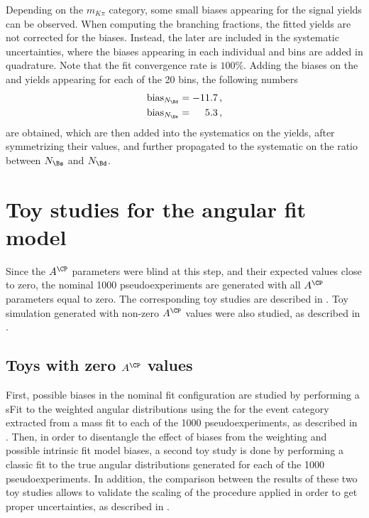 Depending on the $m_{K\pi}$ category, some small biases appearing for the \Bs signal yields can be observed. When computing the branching fractions, the fitted yields are not corrected for the biases. Instead, the later are included in the systematic uncertainties, where the biases appearing in each individual \mkpi and \cosTmu bins are added in quadrature. Note that the fit convergence rate is $100\%$. Adding the biases on the \Bs and \Bd yields appearing for each of the 20 bins, the following numbers
\begin{align}
{\rm bias}_{N_{\Bd}} &= -11.7 \, ,\\
{\rm bias}_{N_{\Bs}} &= \phantom{-2}5.3\, ,
\end{align}
are obtained, which are then added into the systematics on the yields, after symmetrizing their values, and further propagated to the systematic on the ratio between $N_{\Bs}$ and $N_{\Bd}$. 
\section{Toy studies for the angular fit model}\label{app:BsJpsiKst_AngularToysimulation}
Since the $A^{\CP}$ parameters were blind at this step, and their expected values close to zero, the nominal 1000 pseudoexperiments are generated with all $A^{\CP}$ parameters equal to zero. The corresponding toy studies are described in . Toy simulation generated with non-zero $A^{\CP}$ values were also studied, as described in .
\subsection{Toys with zero $A^{\CP}$ values}\label{sec:ZACPs}
First, possible biases in the nominal fit configuration are studied by performing a sFit to the weighted angular distributions using the \sweights for the \Bs event category extracted from a mass fit to each of the 1000 pseudoexperiments, as described in . Then, in order to disentangle the effect of biases from the weighting and possible intrinsic fit model biases, a second toy study is done by performing a classic fit to the true \Bs angular distributions generated for each of the 1000 pseudoexperiments. In addition, the comparison between the results of these two toy studies allows to validate the scaling of the \sweights procedure applied in order to get proper uncertainties, as described in .
%

